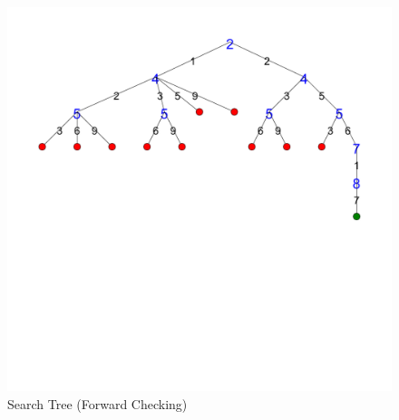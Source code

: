 \begin{figure}[ht]
\caption{\label{sudoku:searchtreefc}Search Tree (Forward Checking)}
\begin{center}
\includegraphics[width=12cm]{../sudoku/FC/tree_expanded_20}
\end{center}
\end{figure}



